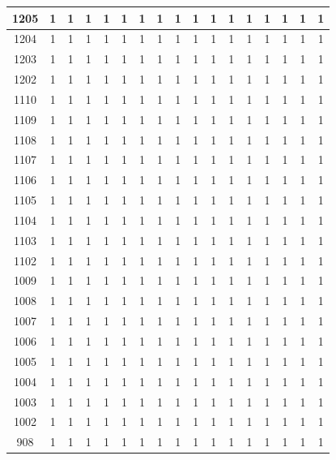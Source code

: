 \begin{itemize}
\begin{longtable}[c]{|c|c|c|c|c|c|c|c|c|c|c|c|c|c|c|c|c|}
1205 & 1 & 1 & 1 & 1 & 1 & 1 & 1 & 1 & 1 & 1 & 1 & 1 & 1 & 1 & 1 & 1 \\ \hline
1204 & 1 & 1 & 1 & 1 & 1 & 1 & 1 & 1 & 1 & 1 & 1 & 1 & 1 & 1 & 1 & 1 \\ \hline
1203 & 1 & 1 & 1 & 1 & 1 & 1 & 1 & 1 & 1 & 1 & 1 & 1 & 1 & 1 & 1 & 1 \\ \hline
1202 & 1 & 1 & 1 & 1 & 1 & 1 & 1 & 1 & 1 & 1 & 1 & 1 & 1 & 1 & 1 & 1 \\ \hline
1110 & 1 & 1 & 1 & 1 & 1 & 1 & 1 & 1 & 1 & 1 & 1 & 1 & 1 & 1 & 1 & 1 \\ \hline
1109 & 1 & 1 & 1 & 1 & 1 & 1 & 1 & 1 & 1 & 1 & 1 & 1 & 1 & 1 & 1 & 1 \\ \hline
1108 & 1 & 1 & 1 & 1 & 1 & 1 & 1 & 1 & 1 & 1 & 1 & 1 & 1 & 1 & 1 & 1 \\ \hline
1107 & 1 & 1 & 1 & 1 & 1 & 1 & 1 & 1 & 1 & 1 & 1 & 1 & 1 & 1 & 1 & 1 \\ \hline
1106 & 1 & 1 & 1 & 1 & 1 & 1 & 1 & 1 & 1 & 1 & 1 & 1 & 1 & 1 & 1 & 1 \\ \hline
1105 & 1 & 1 & 1 & 1 & 1 & 1 & 1 & 1 & 1 & 1 & 1 & 1 & 1 & 1 & 1 & 1 \\ \hline
1104 & 1 & 1 & 1 & 1 & 1 & 1 & 1 & 1 & 1 & 1 & 1 & 1 & 1 & 1 & 1 & 1 \\ \hline
1103 & 1 & 1 & 1 & 1 & 1 & 1 & 1 & 1 & 1 & 1 & 1 & 1 & 1 & 1 & 1 & 1 \\ \hline
1102 & 1 & 1 & 1 & 1 & 1 & 1 & 1 & 1 & 1 & 1 & 1 & 1 & 1 & 1 & 1 & 1 \\ \hline
1009 & 1 & 1 & 1 & 1 & 1 & 1 & 1 & 1 & 1 & 1 & 1 & 1 & 1 & 1 & 1 & 1 \\ \hline
1008 & 1 & 1 & 1 & 1 & 1 & 1 & 1 & 1 & 1 & 1 & 1 & 1 & 1 & 1 & 1 & 1 \\ \hline
1007 & 1 & 1 & 1 & 1 & 1 & 1 & 1 & 1 & 1 & 1 & 1 & 1 & 1 & 1 & 1 & 1 \\ \hline
1006 & 1 & 1 & 1 & 1 & 1 & 1 & 1 & 1 & 1 & 1 & 1 & 1 & 1 & 1 & 1 & 1 \\ \hline
1005 & 1 & 1 & 1 & 1 & 1 & 1 & 1 & 1 & 1 & 1 & 1 & 1 & 1 & 1 & 1 & 1 \\ \hline
1004 & 1 & 1 & 1 & 1 & 1 & 1 & 1 & 1 & 1 & 1 & 1 & 1 & 1 & 1 & 1 & 1 \\ \hline
1003 & 1 & 1 & 1 & 1 & 1 & 1 & 1 & 1 & 1 & 1 & 1 & 1 & 1 & 1 & 1 & 1 \\ \hline
1002 & 1 & 1 & 1 & 1 & 1 & 1 & 1 & 1 & 1 & 1 & 1 & 1 & 1 & 1 & 1 & 1 \\ \hline
908 & 1 & 1 & 1 & 1 & 1 & 1 & 1 & 1 & 1 & 1 & 1 & 1 & 1 & 1 & 1 & 1 \\ \hline

\end{longtable}
\end{itemize}

